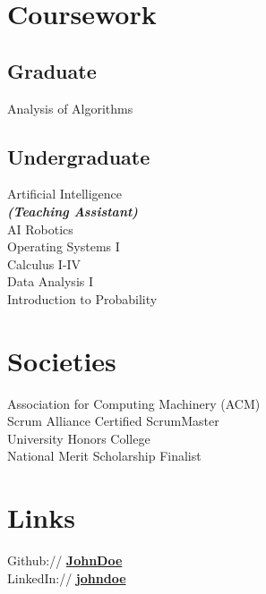 \documentclass[]{deedy-resume-reversed}
\begin{document}
\begin{minipage}[t]{0.33\textwidth}

\section{Coursework}
\subsection{Graduate}
Analysis of Algorithms
\sectionsep

\subsection{Undergraduate}
Artificial Intelligence \\
{\footnotesize \textit{\textbf{(Teaching Assistant) }}} \\
AI Robotics \\
Operating Systems I \\
Calculus I-IV \\
Data Analysis I \\
Introduction to Probability \\
\sectionsep


\section{Societies}
Association for Computing Machinery (ACM)\\
Scrum Alliance Certified ScrumMaster\\
University Honors College\\
National Merit Scholarship Finalist \\
\sectionsep


\section{Links}
Github:// \href{https://github.com/}{\bf JohnDoe} \\
LinkedIn://  \href{https://www.linkedin.com/}{\bf johndoe}
\sectionsep

\end{minipage}
\end{document}
